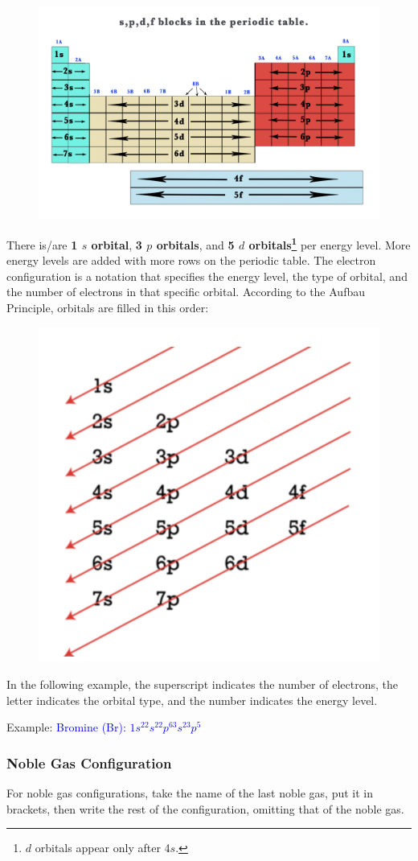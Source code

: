\documentclass[a4paper, 12pt]{article}
\begin{document}
\begin{figure}[H]
    \centering
    \includegraphics[width=0.6\linewidth]{spdfblocks.png}
    \label{fig:CHEMISTRY}
\end{figure}
\noindent There is/are \textbf{1 $s$ orbital}, \textbf{3 $p$ orbitals}, and \textbf{5 $d$ orbitals\footnote{$d$ orbitals appear only after 4$s$.}} per energy level. More energy levels are added with more rows on the periodic table. The electron configuration is a notation that specifies the energy level, the type of orbital, and the number of electrons in that specific orbital. According to the Aufbau Principle, orbitals are filled in this order: 

\begin{figure}[H]
    \centering
    \includegraphics[width=0.4\linewidth]{aufbauprinciple.png}
    \label{fig:please no errors <3}
\end{figure}

\noindent In the following example, the superscript indicates the number of electrons, the letter indicates the orbital type, and the number indicates the energy level.

Example: \textcolor{blue}{Bromine (Br): $1s^22s^22p^63s^23p^5$}

\subsubsection{Noble Gas Configuration}
For noble gas configurations, take the name of the last noble gas, put it in brackets, then write the rest of the configuration, omitting that of the noble gas.
\end{document}
